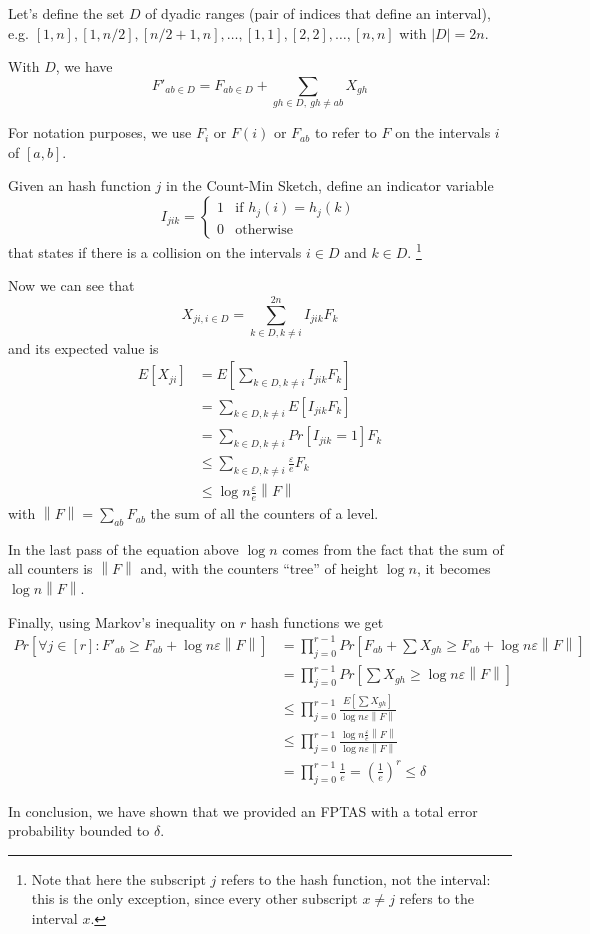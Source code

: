 \documentclass{article}
\begin{document}
Let's define the set $D$ of dyadic ranges (pair of indices that define an interval), e.g. $[1,n],[1,n/2],[n/2+1,n],\ldots,[1,1],[2,2],\ldots,[n,n]$ with $|D|=2n$.

With $D$, we have $$F'_{ab\in D}=F_{ab\in D}+\sum_{gh\in D,\ gh\neq ab}X_{gh}$$

For notation purposes, we use $F_i$ or $F(i)$ or $F_{ab}$ to refer to $F$ on the intervals $i$ of $[a,b]$.

Given an hash function $j$ in the Count-Min Sketch, define an indicator variable $$I_{jik}=\begin{cases} 1 & \text{if }h_j(i)=h_j(k)\\0 & \text{otherwise}\end{cases}$$ that states if there is a collision on the intervals $i\in D$ and $k\in D$. \footnote{Note that here the subscript $j$ refers to the hash function, not the interval: this is the only exception, since every other subscript $x\neq j$ refers to the interval $x$.}

Now we can see that $$X_{ji,i\in D}=\sum_{k\in D,k\neq i}^{2n}I_{jik}F_k$$ and its expected value is
\begin{align*}
    E[X_{ji}]&=E\left[\sum_{k\in D, k\neq i}I_{jik}F_k\right]\\
    &=\sum_{k\in D, k\neq i}E[I_{jik}F_k]\\
    &=\sum_{k\in D, k\neq i}Pr[I_{jik}=1]F_k\\
    &\leq\sum_{k\in D, k\neq i}\frac{\varepsilon}{e}F_k\\
    &\leq\log n\frac{\varepsilon}{e}\left \|F\right\|
\end{align*}
 with $\left \|F\right\| =\sum_{ab}F_{ab}$ the sum of all the counters of a level.
 
In the last pass of the equation above $\log n$ comes from the fact that the sum of all counters is $\left\| F\right\|$ and, with the counters ``tree'' of height $\log n$, it becomes $\log n \left\| F\right\|$.

Finally, using Markov's inequality on $r$ hash functions we get 
\begin{align*}
    Pr\left[\forall j\in [r]:F'_{ab}\geq F_{ab}+\log n\varepsilon \left \|F\right\| \right]&=\prod_{j=0}^{r-1} Pr\left[F_{ab}+\sum X_{gh} \geq F_{ab}+\log n\varepsilon \left \|F\right\| \right]\\
    &=\prod_{j=0}^{r-1}Pr\left[\sum X_{gh} \geq \log n\varepsilon \left \|F\right\| \right]\\
    &\leq \prod_{j=0}^{r-1}\frac{E\left[\sum X_{gh}\right]}{\log n\varepsilon \left \|F\right\| } \\
    &\leq \prod_{j=0}^{r-1}\frac{\log n\frac{\varepsilon}{e} \left \|F\right\| }{\log n\varepsilon \left \|F\right\| }\\
    &=\prod_{j=0}^{r-1}\frac{1}{e}=\left(\frac{1}{e}\right)^r\leq \delta
\end{align*}

In conclusion, we have shown that we provided an FPTAS with a total error probability bounded to $\delta$.
\end{document}

